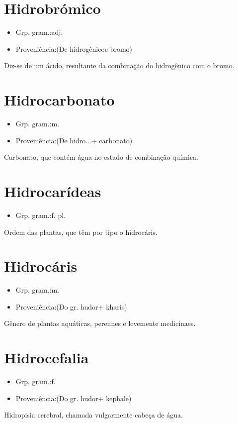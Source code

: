 \documentclass{article}
\begin{document}
\section{Hidrobrómico}
\begin{itemize}
\item {Grp. gram.:adj.}
\end{itemize}
\begin{itemize}
\item {Proveniência:(De \textunderscore hidrogênico\textunderscore  e \textunderscore bromo\textunderscore )}
\end{itemize}
Diz-se de um ácido, resultante da combinação do hidrogênico com o bromo.
\section{Hidrocarbonato}
\begin{itemize}
\item {Grp. gram.:m.}
\end{itemize}
\begin{itemize}
\item {Proveniência:(De \textunderscore hidro...\textunderscore  + \textunderscore carbonato\textunderscore )}
\end{itemize}
Carbonato, que contém água no estado de combinação química.
\section{Hidrocarídeas}
\begin{itemize}
\item {Grp. gram.:f. pl.}
\end{itemize}
Ordem das plantas, que têm por tipo o hidrocáris.
\section{Hidrocáris}
\begin{itemize}
\item {Grp. gram.:m.}
\end{itemize}
\begin{itemize}
\item {Proveniência:(Do gr. \textunderscore hudor\textunderscore  + \textunderscore kharis\textunderscore )}
\end{itemize}
Gênero de plantas aquáticas, perennes e levemente medicinaes.
\section{Hidrocefalia}
\begin{itemize}
\item {Grp. gram.:f.}
\end{itemize}
\begin{itemize}
\item {Proveniência:(Do gr. \textunderscore hudor\textunderscore  + \textunderscore kephale\textunderscore )}
\end{itemize}
Hidropisia cerebral, chamada vulgarmente \textunderscore cabeça de água\textunderscore .
\end{document}
